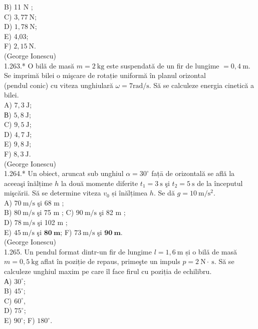 \documentclass[10pt]{article}
\begin{document}
B) 11 N ;\\
C) $3,77 \mathrm{~N}$;\\
D) $1,78 \mathrm{~N}$;\\
E) 4,03;\\
F) $2,15 \mathrm{~N}$.\\
(George Ionescu)\\
1.263.* O bilă de masă $m=2 \mathrm{~kg}$ este suspendată de un fir de lungime $=0,4 \mathrm{~m}$. Se imprimă bilei o mişcare de rotație uniformă în planul orizontal\\
(pendul conic) cu viteza unghiulară $\omega=7 \mathrm{rad} / \mathrm{s}$. Să se calculeze energia cinetică a bilei.\\
A) $7,3 \mathrm{~J}$;\\
В) $5,8 \mathrm{~J}$;\\
C) $9,5 \mathrm{~J}$;\\
D) $4,7 \mathrm{~J}$;\\
E) $9,8 \mathrm{~J}$;\\
F) $8,3 \mathrm{~J}$.\\
(George Ionescu)\\
1.264.* Un obiect, aruncat sub unghiul $\alpha=30^{\circ}$ fațā de orizontală se află la aceeaşi înălțime $h$ la două momente diferite $t_{1}=3 \mathrm{~s}$ şi $t_{2}=5 \mathrm{~s}$ de la începutul mişcării. Să se determine viteza $v_{0}$ și înălțimea $h$. Se dă $g=10 \mathrm{~m} / \mathrm{s}^{2}$.\\
A) $70 \mathrm{~m} / \mathrm{s}$ şi 68 m ;\\
B) $80 \mathrm{~m} / \mathrm{s}$ şi 75 m ; C) $90 \mathrm{~m} / \mathrm{s}$ şi 82 m ;\\
D) $78 \mathrm{~m} / \mathrm{s}$ şi 102 m ;\\
E) $45 \mathrm{~m} / \mathrm{s}$ şi $\mathbf{8 0 ~ m}$; F) $73 \mathrm{~m} / \mathrm{s}$ şi $\mathbf{9 0 ~ m}$.\\
(George Ionescu)\\
1.265. Un pendul format dintr-un fir de lungime $l=1,6 \mathrm{~m}$ și o bilă de masă $m=0,5 \mathrm{~kg}$ aflat în poziție de repaus, primeşte un impuls $p=2 \mathrm{~N} \cdot \mathrm{~s}$. Să se calculeze unghiul maxim pe care îl face firul cu poziția de echilibru.\\
А) $30^{\circ}$;\\
B) $45^{\circ}$;\\
C) $60^{\circ}$,\\
D) $75^{\circ}$;\\
E) $90^{\circ}$; F) $180^{\circ}$.\\
\end{document}
